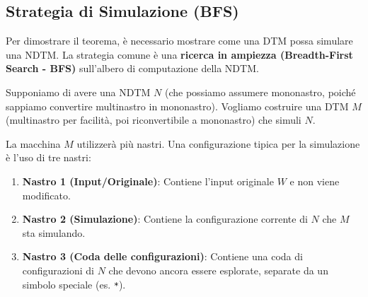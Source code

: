 \documentclass[a4paper]{article}
\theoremstyle{definition} %
\begin{document}
\subsection{Strategia di Simulazione (BFS)}
Per dimostrare il teorema, è necessario mostrare come una DTM possa simulare una NDTM. La strategia comune è una \textbf{ricerca in ampiezza (Breadth-First Search - BFS)} sull'albero di computazione della NDTM.

Supponiamo di avere una NDTM $N$ (che possiamo assumere mononastro, poiché sappiamo convertire multinastro in mononastro). Vogliamo costruire una DTM $M$ (multinastro per facilità, poi riconvertibile a mononastro) che simuli $N$.


La macchina $M$ utilizzerà più nastri. Una configurazione tipica per la simulazione è l'uso di tre nastri:
\begin{enumerate}
    \item \textbf{Nastro 1 (Input/Originale)}: Contiene l'input originale $W$ e non viene modificato.
    \item \textbf{Nastro 2 (Simulazione)}: Contiene la configurazione corrente di $N$ che $M$ sta simulando.
    \item \textbf{Nastro 3 (Coda delle configurazioni)}: Contiene una coda di configurazioni di $N$ che devono ancora essere esplorate, separate da un simbolo speciale (es. \texttt{*}).
\end{enumerate}
\end{document}
